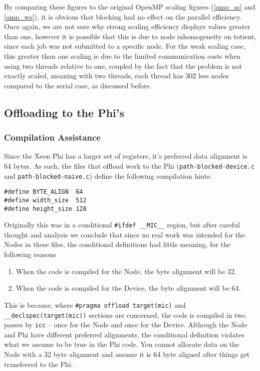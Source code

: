 \documentclass[11pt]{article}
\begin{document}
\noindent By comparing these figures to the original OpenMP scaling figures (\ref{omp_ss} and \ref{omp_ws}), it is obvious that blocking had no effect on the parallel efficiency. Once again, we are not sure why strong scaling efficiency displays values greater than one, however it is possible that this is due to node inhomogeneity on totient, since each job was not submitted to a specific node. For the weak scaling case, this greater than one scaling is due to the limited communication costs when using two threads relative to one, coupled by the fact that the problem is not exactly scaled, meaning with two threads, each thread has 302 less nodes compared to the serial case, as discussed before. 

\subsection{Offloading to the Phi's}

\subsubsection{Compilation Assistance}

Since the Xeon Phi has a larger set of registers, it's preferred data alignment is 64 bytes.  As such, the files that offload work to the Phi (\texttt{path-blocked-device.c} and \texttt{path-blocked-naive.c}) define the following compilation hints:

\begin{lstlisting}
#define BYTE_ALIGN  64
#define width_size  512
#define height_size 128
\end{lstlisting}

\noindent Originally this was in a conditional \texttt{\#ifdef \_\_MIC\_\_} region, but after careful thought and analysis we conclude that since no real work was intended for the Nodes in these files, the conditional definitions had little meaning, for the following reasons

\begin{enumerate}[1.]
  \item When the code is compiled for the Node, the byte alignment will be 32.
  \item When the code is compiled for the Device, the byte alignment will be 64.
\end{enumerate}

\noindent This is because, where \texttt{\#pragma offload target(mic)} and \texttt{\_\_declspec(target(mic))} sections are concerned, the code is compiled in two passes by \texttt{icc} -- once for the Node and once for the Device.  Although the Node and Phi have different preferred alignments, the conditional definition violates what we assume to be true in the Phi code.  You cannot allocate data on the Node with a 32 byte alignment and assume it is 64 byte aligned after things get transferred to the Phi.\\
\end{document}
